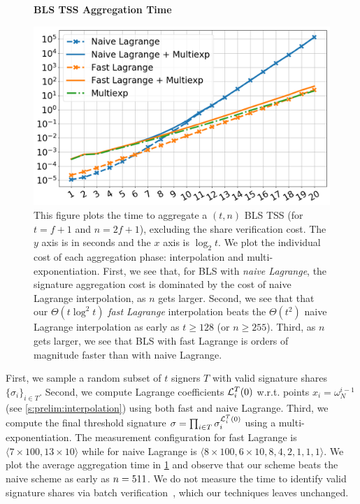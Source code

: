 \begin{figure}[t]
    \centering
    \textbf{BLS TSS Aggregation Time}\par\medskip
    \includegraphics[width=0.70\columnwidth]{figures-thresh/thresh.png}
    \caption{
        This figure plots the time to aggregate a $(t,n)$ BLS TSS (for $t=f+1$ and $n=2f+1$), excluding the share verification cost.
        The $y$ axis is in seconds and the $x$ axis is $\log_2{t}$.
        We plot the individual cost of each aggregation phase: interpolation and multi-exponentiation.
        First, we see that, for BLS with \textit{naive Lagrange}, the signature aggregation cost is dominated by the cost of naive Lagrange interpolation, as $n$ gets larger.
        Second, we see that that our $\Theta(t\log^2{t})$ \textit{fast Lagrange} interpolation beats the $\Theta(t^2)$ naive Lagrange interpolation as early as $t \ge 128$ (or $n \ge 255$).
        Third, as $n$ gets larger, we see that BLS with fast Lagrange is orders of magnitude faster than with naive Lagrange.
    }
    \label{f:thresh}
\end{figure}

First, we sample a random subset of $t$ signers $T$ with valid signature shares $\{\sigma_i\}_{i\in T}$.
Second, we compute Lagrange coefficients $\mathcal{L}_i^T(0)$ w.r.t. points $x_i = \omega_N^{i-1}$ (see \cref{s:prelim:interpolation}) using both fast and naive Lagrange.
Third, we compute the final threshold signature $\sigma = \prod_{i\in T} \sigma_i^{\mathcal{L}_i^T(0)}$ using a multi-exponentiation.
The measurement configuration for fast Lagrange is $\langle 7 \times 100, 13 \times 10 \rangle$ while for naive Lagrange is $\langle 8\times 100, 6 \times 10, 8, 4, 2, 1,1,1\rangle$.
We plot the average aggregation time in \cref{f:thresh} and observe that our scheme beats the naive scheme as early as $n = 511$.
We do not measure the time to identify valid signature shares via batch verification~\cite{Boldyreva03}, which our techniques leaves unchanged.

